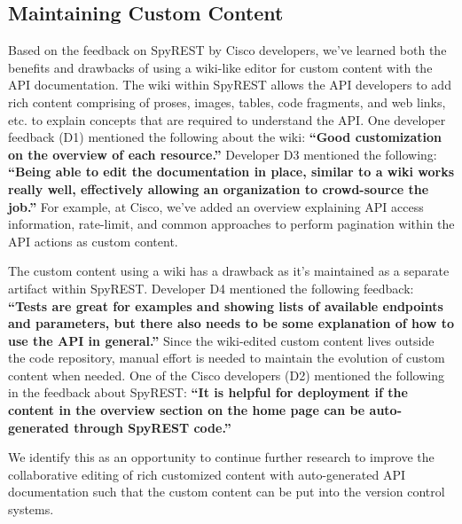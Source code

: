 \subsection{Maintaining Custom Content}
Based on the feedback on SpyREST by Cisco developers, we've learned both the benefits and drawbacks of using a wiki-like editor for custom content with the API documentation. The wiki within SpyREST allows the API developers to add rich content comprising of proses, images, tables, code fragments, and web links, etc. to explain concepts that are required to understand the API. One developer feedback (D1) mentioned the following about the wiki: \textbf{``Good customization on the overview of each resource.''} Developer D3 mentioned the following: \textbf{``Being able to edit the documentation in place, similar to a wiki works really well, effectively allowing an organization to crowd-source the job.''} For example, at Cisco, we've added an overview explaining API access information, rate-limit, and common approaches to perform pagination within the API actions as custom content.

The custom content using a wiki has a drawback as it's maintained as a separate artifact within SpyREST. Developer D4 mentioned the following feedback: \textbf{``Tests are great for examples and showing lists of available endpoints and parameters, but there also needs to be some explanation of how to use the API in general.''} Since the wiki-edited custom content lives outside the code repository, manual effort is needed to maintain the evolution of custom content when needed. One of the Cisco developers (D2) mentioned the following in the feedback about SpyREST: \textbf{``It is helpful for deployment if the content in the overview section on the home page can be auto-generated through SpyREST code.''}

We identify this as an opportunity to continue further research to improve the collaborative editing of rich customized content with auto-generated API documentation such that the custom content can be put into the version control systems.

